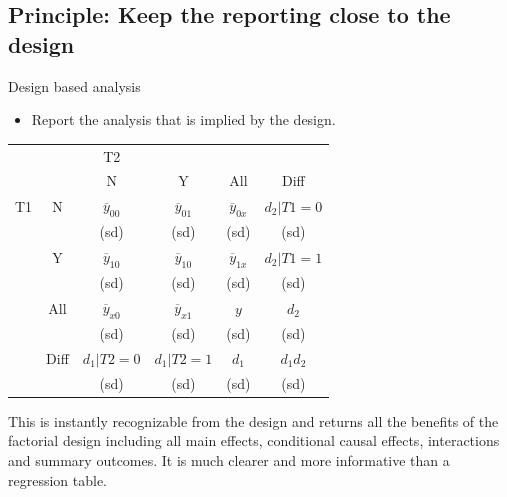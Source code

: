 \documentclass[
  11pt,
  ignorenonframetext,
]{beamer}
\providecommand{\tightlist}{%
  \setlength{\itemsep}{0pt}\setlength{\parskip}{0pt}}\usepackage{longtable,booktabs,array}
\begin{document}
\hypertarget{principle-keep-the-reporting-close-to-the-design}{%
\subsection{Principle: Keep the reporting close to the
design}\label{principle-keep-the-reporting-close-to-the-design}}

\begin{frame}{Design based analysis}
\protect\hypertarget{design-based-analysis}{}
\begin{itemize}
\tightlist
\item
  Report the analysis that is implied by the design.
\end{itemize}

\begin{table}
\small \centering
\begin{tabular}{cc|ccc|c}\small

           &            &         T2 &            &            &            \\

           &            &          N &          Y &        All &       Diff \\ \hline

        T1 &          N &      $\overline{y}_{00}$ &      $\overline{y}_{01}$ &     $\overline{y}_{0x}$ &    $d_2|T1=0$ \\

           &            &       (sd) &       (sd) &       (sd) &       (sd) \\

           &          Y &      $\overline{y}_{10}$ &      $\overline{y}_{10}$ &         $\overline{y}_{1x}$ &    $d_2|T1=1$ \\

           &            &       (sd) &       (sd) &       (sd) &       (sd) \\

           &        All &     $\overline{y}_{x0}$ &     $\overline{y}_{x1}$ &          $y$ &    $d_2$ \\

           &            &       (sd) &       (sd) &       (sd) &       (sd) \\ \hline

           &       Diff &    $d_1|T2=0$ &    $d_1|T2=1$ &    $d_1$ &    \color{green} $d_1d_2$ \\

           &            &       (sd) &       (sd) &       (sd) &       (sd) \\

\end{tabular}  
\end{table}

This is instantly recognizable from the design and returns all the
benefits of the factorial design including all main effects, conditional
causal effects, interactions and summary outcomes. It is much clearer
and more informative than a regression table.
\end{frame}
\end{document}
